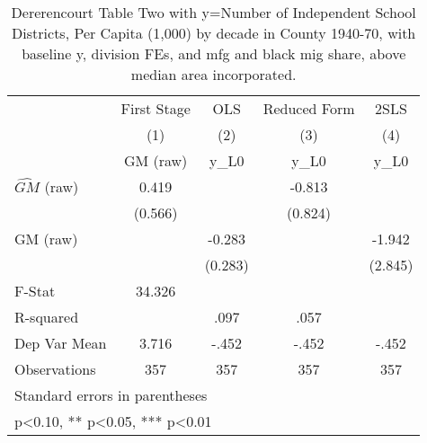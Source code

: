 \begin{table}[htbp]\centering
\def\sym#1{\ifmmode^{#1}\else\(^{#1}\)\fi}
\caption{Dererencourt Table Two with y=Number of Independent School Districts, Per Capita (1,000) by decade in County 1940-70, with baseline y, division FEs, and mfg and black mig share, above median area incorporated.}
\begin{tabular}{l*{4}{c}}
\toprule
                    & First Stage   &         OLS   &Reduced Form   &        2SLS   \\
                    &\multicolumn{1}{c}{(1)}&\multicolumn{1}{c}{(2)}&\multicolumn{1}{c}{(3)}&\multicolumn{1}{c}{(4)}\\
                    &\multicolumn{1}{c}{GM  (raw)}&\multicolumn{1}{c}{y\_L0}&\multicolumn{1}{c}{y\_L0}&\multicolumn{1}{c}{y\_L0}\\
\midrule
$\hat{GM}$ (raw)    &       0.419   &               &      -0.813   &               \\
                    &     (0.566)   &               &     (0.824)   &               \\
\addlinespace
GM  (raw)           &               &      -0.283   &               &      -1.942   \\
                    &               &     (0.283)   &               &     (2.845)   \\
\midrule
F-Stat              &      34.326   &               &               &               \\
R-squared           &               &        .097   &        .057   &               \\
Dep Var Mean        &       3.716   &       -.452   &       -.452   &       -.452   \\
Observations        &         357   &         357   &         357   &         357   \\
\bottomrule
\multicolumn{5}{l}{\footnotesize Standard errors in parentheses}\\
\multicolumn{5}{l}{\footnotesize * p<0.10, ** p<0.05, *** p<0.01}\\
\end{tabular}
\end{table}

